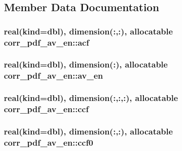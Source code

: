 \subsection{Member Data Documentation}
\hypertarget{classcorr__pdf__av__en_a1f2e0a10f6ede3390f0f961a43e2b95f}{
\subsubsection[{acf}]{\setlength{\rightskip}{0pt plus 5cm}real(kind={\bf dbl}), dimension(\+:,\+:), allocatable corr\+\_\+pdf\+\_\+av\+\_\+en\+::acf}}\label{classcorr__pdf__av__en_a1f2e0a10f6ede3390f0f961a43e2b95f}
\hypertarget{classcorr__pdf__av__en_a8b0559d7361208f6f73d4bfca51bbafc}{
\subsubsection[{av\+\_\+en}]{\setlength{\rightskip}{0pt plus 5cm}real(kind={\bf dbl}), dimension(\+:), allocatable corr\+\_\+pdf\+\_\+av\+\_\+en\+::av\+\_\+en}}\label{classcorr__pdf__av__en_a8b0559d7361208f6f73d4bfca51bbafc}
\hypertarget{classcorr__pdf__av__en_acbadbb02006eb3d6f9d9c6faecc8370f}{
\subsubsection[{ccf}]{\setlength{\rightskip}{0pt plus 5cm}real(kind={\bf dbl}), dimension(\+:,\+:,\+:), allocatable corr\+\_\+pdf\+\_\+av\+\_\+en\+::ccf}}\label{classcorr__pdf__av__en_acbadbb02006eb3d6f9d9c6faecc8370f}
\hypertarget{classcorr__pdf__av__en_a7f6a1a47a3c3d9839341a7cf3f7e43d4}{
\subsubsection[{ccf0}]{\setlength{\rightskip}{0pt plus 5cm}real(kind={\bf dbl}), dimension(\+:,\+:), allocatable corr\+\_\+pdf\+\_\+av\+\_\+en\+::ccf0}}\label{classcorr__pdf__av__en_a7f6a1a47a3c3d9839341a7cf3f7e43d4}
